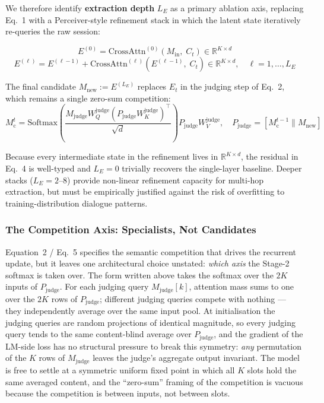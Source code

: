 \documentclass[11pt, a4paper]{article}
\begin{document}
We therefore identify \textbf{extraction depth} $L_E$ as a primary ablation axis, replacing Eq.~1 with a Perceiver-style refinement stack in which the latent state iteratively re-queries the raw session:

\begin{equation}
    E^{(0)} = \text{CrossAttn}^{(0)}\!\left(M_{\text{in}},\; C_t\right) \in \mathbb{R}^{K \times d}
\end{equation}
\begin{equation}
    E^{(\ell)} = E^{(\ell-1)} + \text{CrossAttn}^{(\ell)}\!\left(E^{(\ell-1)},\; C_t\right) \in \mathbb{R}^{K \times d}, \quad \ell = 1, \dots, L_E
\end{equation}

The final candidate $M_{\text{new}} := E^{(L_E)}$ replaces $E_t$ in the judging step of Eq.~2, which remains a single zero-sum competition:
\begin{equation}
    M_{\text{c}}^{t} = \text{Softmax}\!\left(\frac{M_{\text{judge}} W_Q^{\text{judge}} \left(P_{\text{judge}} W_K^{\text{judge}}\right)^\top}{\sqrt{d}}\right) P_{\text{judge}} W_V^{\text{judge}}, \quad P_{\text{judge}} = \left[M_{\text{c}}^{t-1} \parallel M_{\text{new}}\right]
\end{equation}

Because every intermediate state in the refinement lives in $\mathbb{R}^{K \times d}$, the residual in Eq.~4 is well-typed and $L_E = 0$ trivially recovers the single-layer baseline. Deeper stacks ($L_E = 2\text{--}8$) provide non-linear refinement capacity for multi-hop extraction, but must be empirically justified against the risk of overfitting to training-distribution dialogue patterns.

\subsubsection{The Competition Axis: Specialists, Not Candidates}
\label{sec:competition_axis}

Equation~2 / Eq.~5 specifies the semantic competition that drives the recurrent update, but it leaves one architectural choice unstated: \emph{which axis} the Stage-2 softmax is taken over. The form written above takes the softmax over the $2K$ inputs of $P_{\text{judge}}$. For each judging query $M_{\text{judge}}[k]$, attention mass sums to one over the $2K$ rows of $P_{\text{judge}}$; different judging queries compete with nothing --- they independently average over the same input pool. At initialisation the judging queries are random projections of identical magnitude, so every judging query tends to the same content-blind average over $P_{\text{judge}}$, and the gradient of the LM-side loss has no structural pressure to break this symmetry: \emph{any} permutation of the $K$ rows of $M_{\text{judge}}$ leaves the judge's aggregate output invariant. The model is free to settle at a symmetric uniform fixed point in which all $K$ slots hold the same averaged content, and the ``zero-sum'' framing of the competition is vacuous because the competition is between inputs, not between slots.
\end{document}
